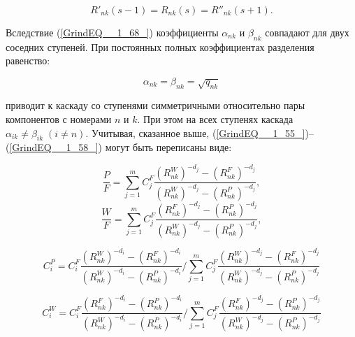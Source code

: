 \begin{equation} \label{GrindEQ__1_68_} 
  R'_{nk} (s-1)=R_{nk} (s)=R''_{nk} (s+1).                                                 
\end{equation} 

Вследствие (\ref{GrindEQ__1_68_}) коэффициенты $\alpha _{nk} $ и $\beta _{nk} $ совпадают для двух соседних ступеней. При постоянных полных коэффициентах разделения равенство:

\begin{equation} \label{GrindEQ__1_69_} 
  \alpha _{nk} =\beta _{nk} =\sqrt{q_{nk} }  
\end{equation} 

приводит к каскаду со ступенями симметричными относительно пары компонентов с номерами $n$ и $k$. При этом на всех ступенях каскада $\alpha _{ik} \ne \beta _{ik} \; (i\ne n)$. Учитывая, сказанное выше, (\ref{GrindEQ__1_55_})--(\ref{GrindEQ__1_58_}) могут быть переписаны виде:
  

\begin{equation} \label{GrindEQ__1_70_} 
  \frac{P}{F} =\sum _{j=1}^{m}C_{j}^{F} \frac{(R_{nk}^{W} )^{-d_{j} } -(R_{nk}^{F} )^{-d_{j} } }{(R_{nk}^{W} )^{-d_{j} } -(R_{nk}^{P} )^{-d_{j} } }  ,                                            
  \end{equation} 
  \begin{equation} \label{GrindEQ__1_71_} 
  \frac{W}{F} =\sum _{j=1}^{m}C_{j}^{F} \frac{(R_{nk}^{F} )^{-d_{j} } -(R_{nk}^{P} )^{-d_{j} } }{(R_{nk}^{W} )^{-d_{j} } -(R_{nk}^{P} )^{-d_{j} } }  ,                                        
\end{equation} 

\begin{equation} \label{GrindEQ__1_72_} 
  C_{i}^{P}=C_{i}^{F} \frac{\left(R_{n k}^{W}\right)^{-d_{i}}-\left(R_{n k}^{F}\right)^{-d_{i}}}{\left(R_{n k}^{W}\right)^{-d_{i}}-\left(R_{n k}^{P}\right)^{-d_{i}}} / \sum_{j=1}^{m} C_{j}^{F} \frac{\left(R_{n k}^{W}\right)^{-d_{j}}-\left(R_{n k}^{F}\right)^{-d_{j}}}{\left(R_{n k}^{W}\right)^{-d_{j}}-\left(R_{n k}^{P}\right)^{-d_{j}}}
\end{equation} 

\begin{equation} \label{GrindEQ__1_73_} 
  C_{i}^{W}=C_{i}^{F} \frac{\left(R_{n k}^{F}\right)^{-d_{i}}-\left(R_{n k}^{P}\right)^{-d_{i}}}{\left(R_{n k}^{W}\right)^{-d_{i}}-\left(R_{n k}^{P}\right)^{-d_{i}}} / \sum_{j=1}^{m} C_{j}^{F} \frac{\left(R_{n k}^{F}\right)^{-d_{j}}-\left(R_{n k}^{P}\right)^{-d_{j}}}{\left(R_{n k}^{W}\right)^{-d_{j}}-\left(R_{n k}^{P}\right)^{-d_{j}}}
\end{equation} 

